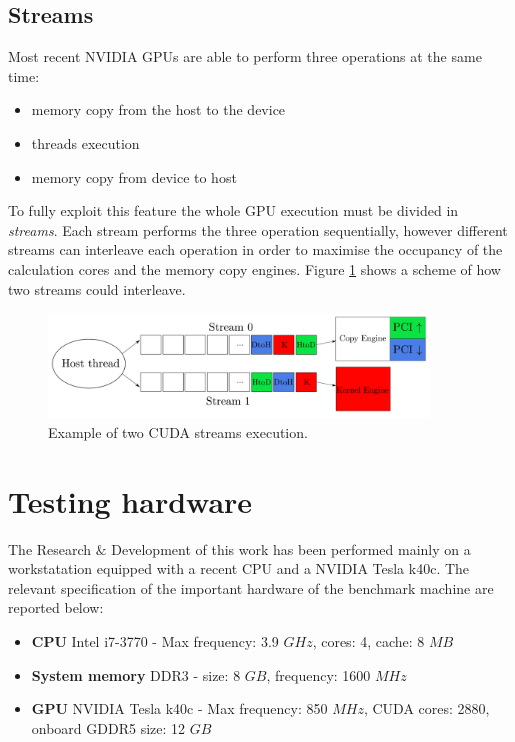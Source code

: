 \subsection{Streams}
Most recent NVIDIA GPUs are able to perform three operations at the same time:
\begin{itemize}
\item memory copy from the host to the device
\item threads execution 
\item memory copy from device to host
\end{itemize}
 To fully exploit this feature the whole GPU execution must be divided in \textit{streams}. Each stream performs the three operation sequentially, however different streams can interleave each operation in order to maximise the occupancy of the calculation cores and the memory copy engines. Figure \ref{streams} shows a scheme of how two streams could interleave.

\begin{figure}
\centerline{\includegraphics[width=0.9\textwidth]{architectures/streams.png}}
\caption{Example of two CUDA streams execution.}
\label{streams}
\end{figure}
\newpage

\section{Testing hardware}\label{sec:benchmark}
The Research $\&$ Development of this work has been performed mainly on a workstatation equipped with a recent CPU and a NVIDIA Tesla k40c.
The relevant specification of the important hardware of the benchmark machine are reported below:
\begin{itemize}
\item \textbf{CPU} Intel i7-3770 - Max frequency: 3.9 $\unit{GHz}$, cores: 4, cache: 8 $\unit{MB}$
\item \textbf{System memory} DDR3 - size: 8 $\unit{GB}$, frequency: 1600 $\unit{MHz}$
\item \textbf{GPU} NVIDIA Tesla k40c - Max frequency: 850 $\unit{MHz}$, CUDA cores: 2880, onboard GDDR5 size: 12 $\unit{GB}$
\end{itemize}
